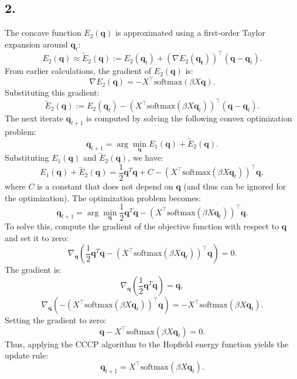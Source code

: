 \documentclass[a4paper, 12pt]{article}
\begin{document}
\subsection*{2.}
The concave function \( E_2(\mathbf{q}) \) is approximated using a first-order Taylor expansion around \( \mathbf{q}_t \):
\[
E_2(\mathbf{q}) \approx \tilde{E}_2(\mathbf{q}) := E_2(\mathbf{q}_t) + (\nabla E_2(\mathbf{q_t}))^\top (\mathbf{q} - \mathbf{q}_t).
\]From earlier calculations, the gradient of \( E_2(\mathbf{q}) \) is:
\[
\nabla E_2(\mathbf{q}) = -X^\top \text{softmax}(\beta X \mathbf{q}).
\]
Substituting this gradient:
\[
\tilde{E}_2(\mathbf{q}) := E_2(\mathbf{q}_t) - \left( X^\top \text{softmax}(\beta X \mathbf{q}_t) \right)^\top (\mathbf{q} - \mathbf{q}_t).
\]
The next iterate \( \mathbf{q}_{t+1} \) is computed by solving the following convex optimization problem:
\[
\mathbf{q}_{t+1} = \arg \min_{\mathbf{q}} E_1(\mathbf{q}) + \tilde{E}_2(\mathbf{q}).
\]
Substituting \( E_1(\mathbf{q}) \) and \( \tilde{E}_2(\mathbf{q}) \), we have:
\[
E_1(\mathbf{q}) + \tilde{E}_2(\mathbf{q}) = \frac{1}{2} \mathbf{q}^T\mathbf{q} + C - \left( X^\top \text{softmax}(\beta X \mathbf{q}_t) \right)^\top \mathbf{q},
\]
where \( C \) is a constant that does not depend on \( \mathbf{q} \) (and thus can be ignored for the optimization). The optimization problem becomes:
\[
\mathbf{q}_{t+1} = \arg \min_{\mathbf{q}} \frac{1}{2} \mathbf{q}^T\mathbf{q} - \left( X^\top \text{softmax}(\beta X \mathbf{q}_t) \right)^\top \mathbf{q}.
\]
To solve this, compute the gradient of the objective function with respect to \( \mathbf{q} \) and set it to zero:
\[
\nabla_\mathbf{q} \left( \frac{1}{2} \mathbf{q}^T\mathbf{q}- \left( X^\top \text{softmax}(\beta X \mathbf{q}_t) \right)^\top \mathbf{q} \right) = 0.
\]
The gradient is:
\[
\nabla_\mathbf{q} \left( \frac{1}{2} \mathbf{q}^T\mathbf{q} \right) = \mathbf{q},
\]
\[
\nabla_\mathbf{q} \left( -\left( X^\top \text{softmax}(\beta X \mathbf{q}_t) \right)^\top \mathbf{q} \right) = -X^\top \text{softmax}(\beta X \mathbf{q}_t).
\]
Setting the gradient to zero:
\[
\mathbf{q} - X^\top \text{softmax}(\beta X \mathbf{q}_t) = 0.
\]
Thus, applying the CCCP algorithm to the Hopfield energy function yields the update rule:
\[
\mathbf{q}_{t+1} = X^\top \text{softmax}(\beta X \mathbf{q}_t).
\]
\end{document}
